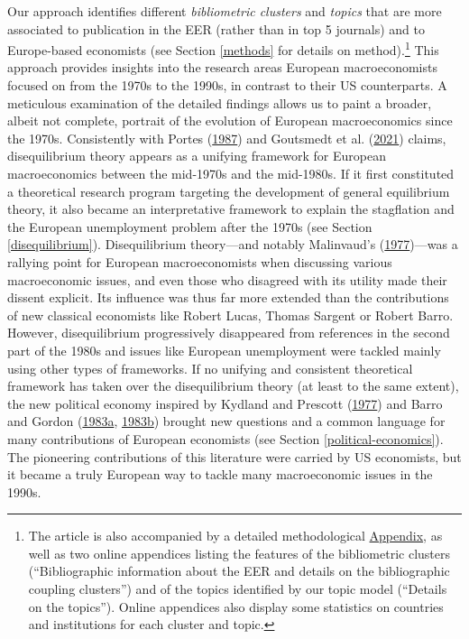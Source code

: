\documentclass[
  12pt,
  onecolumn]{article}
\begin{document}
Our approach identifies different \emph{bibliometric clusters} and
\emph{topics} that are more associated to publication in the EER (rather
than in top 5 journals) and to Europe-based economists (see Section
\ref{methods} for details on method).\footnote{The article is also
  accompanied by a detailed methodological
  \protect\hyperlink{appendix}{Appendix}, as well as two online
  appendices listing the features of the bibliometric clusters
  (``Bibliographic information about the EER and details on the
  bibliographic coupling clusters'') and of the topics identified by our
  topic model (``Details on the topics''). Online appendices also
  display some statistics on countries and institutions for each cluster
  and topic.} This approach provides insights into the research areas
European macroeconomists focused on from the 1970s to the 1990s, in
contrast to their US counterparts. A meticulous examination of the
detailed findings allows us to paint a broader, albeit not complete,
portrait of the evolution of European macroeconomics since the 1970s.
Consistently with Portes (\protect\hyperlink{ref-portes1987}{1987}) and
Goutsmedt et al. (\protect\hyperlink{ref-goutsmedt2021}{2021}) claims,
disequilibrium theory appears as a unifying framework for European
macroeconomics between the mid-1970s and the mid-1980s. If it first
constituted a theoretical research program targeting the development of
general equilibrium theory, it also became an interpretative framework
to explain the stagflation and the European unemployment problem after
the 1970s (see Section \ref{disequilibrium}). Disequilibrium
theory---and notably Malinvaud's
(\protect\hyperlink{ref-malinvaud1977}{1977})---was a rallying point for
European macroeconomists when discussing various macroeconomic issues,
and even those who disagreed with its utility made their dissent
explicit. Its influence was thus far more extended than the
contributions of new classical economists like Robert Lucas, Thomas
Sargent or Robert Barro. However, disequilibrium progressively
disappeared from references in the second part of the 1980s and issues
like European unemployment were tackled mainly using other types of
frameworks. If no unifying and consistent theoretical framework has
taken over the disequilibrium theory (at least to the same extent), the
new political economy inspired by Kydland and Prescott
(\protect\hyperlink{ref-kydland1977}{1977}) and Barro and Gordon
(\protect\hyperlink{ref-barro1983}{1983a},
\protect\hyperlink{ref-barro1983c}{1983b}) brought new questions and a
common language for many contributions of European economists (see
Section \ref{political-economics}). The pioneering contributions of this
literature were carried by US economists, but it became a truly European
way to tackle many macroeconomic issues in the 1990s.
\end{document}
